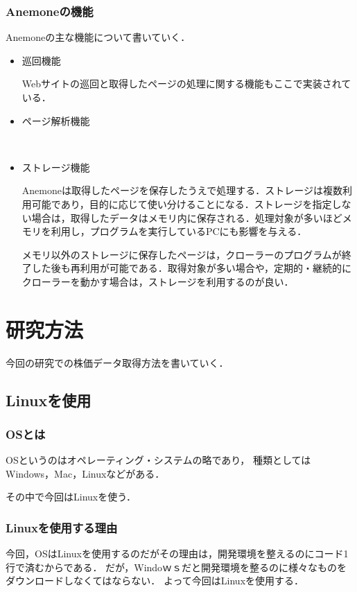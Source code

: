 \subsection{Anemoneの機能}
Anemoneの主な機能について書いていく．

\begin{itemize}
  \item 巡回機能

Webサイトの巡回と取得したページの処理に関する機能もここで実装されている．
  \item ページ解析機能


　\item ストレージ機能

Anemoneは取得したページを保存したうえで処理する．ストレージは複数利用可能であり，目的に応じて使い分けることになる．ストレージを指定しない場合は，取得したデータはメモリ内に保存される．処理対象が多いほどメモリを利用し，プログラムを実行しているPCにも影響を与える．

メモリ以外のストレージに保存したページは，クローラーのプログラムが終了した後も再利用が可能である．取得対象が多い場合や，定期的・継続的にクローラーを動かす場合は，ストレージを利用するのが良い．
\end{itemize}

\chapter{研究方法}

今回の研究での株価データ取得方法を書いていく．


\section{Linuxを使用}
\subsection{OSとは}
OSというのはオペレーティング・システムの略であり，
種類としてはWindows，Mac，Linuxなどがある．

その中で今回はLinuxを使う．

\subsection{Linuxを使用する理由}
今回，OSはLinuxを使用するのだがその理由は，開発環境を整えるのにコード1行で済むからである．
だが，Windoｗｓだと開発環境を整るのに様々なものをダウンロードしなくてはならない．
よって今回はLinuxを使用する．


